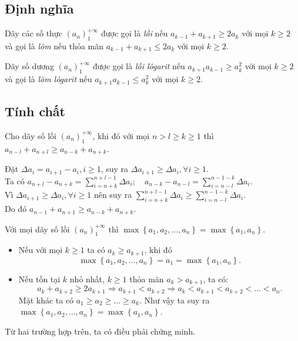 \subsection{Định nghĩa}
\begin{dn}
	Dãy các số thực $\left(a_n\right)_{1}^{+\infty}$ được gọi là \textit{lồi} nếu $a_{k-1} + a_{k+1} \ge 2a_k$ với mọi $k \ge 2$ và gọi là \textit{lõm} nếu thỏa mãn $a_{k-1} + a_{k+1} \le 2a_k$ với mọi $k \ge 2$.
\end{dn}

\begin{dn}
	Dãy số dương $\left(a_n\right)_{1}^{+\infty}$ được gọi là \textit{lồi lôgarit} nếu $a_{k+1}a_{k-1} \ge a_{k}^{2}$ với mọi $k \ge 2$ và gọi là \textit{lõm lôgarit} nếu $a_{k+1}a_{k-1} \le a_{k}^{2}$ với mọi $k \ge 2$.
\end{dn}

\subsection{Tính chất}
\begin{dl}
	Cho dãy số lồi $\left(a_n\right)_{1}^{+\infty}$, khi đó với mọi $n>l \ge k \ge 1$ thì $a_{n-l}+a_{n+l} \ge a_{n-k}+a_{n+k}$.
\end{dl}

\begin{cm}
	Đặt $\Delta a_i = a_{i+1} - a_i, i \ge 1$, suy ra $\Delta a_{i+1} \ge \Delta a_i, \forall i \ge 1$.\\
	Ta có $a_{n+l}-a_{n+k} = \displaystyle\sum_{i=n+k}^{n+l-1}\Delta a_i; \quad a_{n-k}-a_{n-l} = \displaystyle\sum_{i=n-l}^{n-1-k}\Delta a_i$.\\
	Vì $\Delta a_{i+1} \ge \Delta a_i, \forall i \ge 1$ nên suy ra $\displaystyle\sum_{i=n+k}^{n+l-1}\Delta a_i \ge \displaystyle\sum_{i=n-l}^{n-1-k}\Delta a_i$.\\
	Do đó $a_{n-1}+a_{n+1} \ge a_{n-k}+a_{n+k}$.
\end{cm}

\begin{dl}
	Với mọi dãy số lồi $\left(a_n\right)_{1}^{+\infty}$ thì $\max \left\{ a_1,a_2,\ldots, a_n \right\} = \max \left\{ a_1,a_n \right\}$.
\end{dl}

\begin{cm}
	\hspace{0.2cm}
	\begin{itemize}
		\item Nếu với mọi $k \ge 1$ ta có $a_k \ge a_{k+1}$, khi đó $$\max \left\{ a_1,a_2,\ldots, a_n \right\} = a_1 = \max \left\{ a_1,a_n \right\}.$$
		\item Nếu tồn tại $k$ nhỏ nhất, $k \ge 1$ thỏa mãn $a_k > a_{k+1}$, ta có: $$a_k+a_{k+2} \ge 2a_{k+1} \Rightarrow a_{k+1} < a_{k+2} \Rightarrow a_k < a_{k+1} < a_{k+2} < \ldots < a_n.$$
		Mặt khác ta có $a_1 \ge a_2 \ge \ldots \ge a_k$. Như vậy ta suy ra $\max \left\{ a_1,a_2,\ldots, a_n \right\} = \max \left\{ a_1,a_n \right\}$.	
	\end{itemize}
	Từ hai trường hợp trên, ta có điều phải chứng minh.
\end{cm}

